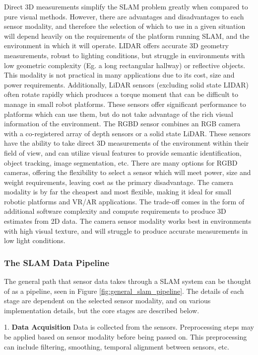 Direct 3D measurements simplify the SLAM problem greatly when compared to pure visual methods. However, there are advantages and disadvantages to each sensor modality, and therefore the selection of which to use in a given situation will depend heavily on the requirements of the platform running SLAM, and the environment in which it will operate. LIDAR offers accurate 3D geometry measurements, robust to lighting conditions, but struggle in environments with low geometric complexity (Eg. a long rectangular hallway) or reflective objects. This modality is not practical in many applications due to its cost, size and power requirements. Additionally, LiDAR sensors (excluding solid state LIDAR) often rotate rapidly which produces a torque moment that can be difficult to manage in small robot platforms. These sensors offer significant performance to platforms which can use them, but do not take advantage of the rich visual information of the environment. The RGBD sensor combines an RGB camera with a co-registered array of depth sensors or a solid state LiDAR. These sensors have the ability to take direct 3D measurements of the environment within their field of view, and can utilize visual features to provide semantic identification, object tracking, image segmentation, etc. There are many options for RGBD cameras, offering the flexibility to select a sensor which will meet power, size and weight requirements, leaving cost as the primary disadvantage. The camera modality is by far the cheapest and most flexible, making it ideal for small robotic platforms and VR/AR applications. The trade-off comes in the form of additional software complexity and compute requirements to produce 3D estimates from 2D data. The camera sensor modality works best in environments with high visual texture, and will struggle to produce accurate measurements in low light conditions.

\subsubsection{The SLAM Data Pipeline}
The general path that sensor data takes through a SLAM system can be thought of as a pipeline, seen in Figure \ref{fig:general_slam_pipeline}. The details of each stage are dependent on the selected sensor modality, and on various implementation details, but the core stages are described below.

1. \textbf{Data Acquisition}\newline
Data is collected from the sensors. Preprocessing steps may be applied based on sensor modality before being passed on. This preprocessing can include filtering, smoothing, temporal alignment between sensors, etc.

